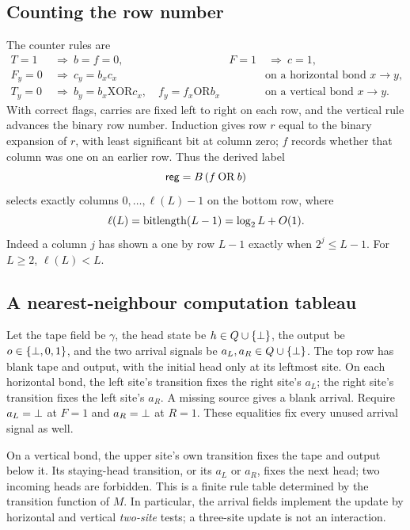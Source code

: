 \subsection{Counting the row number}
The counter rules are
\begin{align*}
 T=1&\ \Longrightarrow\ b=f=0,&
 F=1&\ \Longrightarrow\ c=1,\\
 F_y=0&\ \Longrightarrow\ c_y=b_xc_x
      &&\text{on a horizontal bond }x\to y,\\
 T_y=0&\ \Longrightarrow\ b_y=b_x\mathbin{\mathrm{XOR}}c_x,
 \quad f_y=f_x\mathbin{\mathrm{OR}}b_x
      &&\text{on a vertical bond }x\to y.
\end{align*}
With correct flags, carries are fixed left to right on each row, and the
vertical rule advances the binary row number. Induction gives row $r$
equal to the binary expansion of $r$, with least significant bit at column
zero; $f$ records whether that column was one on an earlier row. Thus the
derived label
\begin{equation}\label{eq:register}
 \mathsf{reg}=B\,(f\mathbin{\mathrm{OR}}b)
\end{equation}
selects exactly columns $0,\ldots,\ell(L)-1$ on the bottom row, where
\begin{equation}\label{eq:ell}
 \ell(L)=\operatorname{bitlength}(L-1)=\log_2 L+O(1).
\end{equation}
Indeed a column $j$ has shown a one by row $L-1$ exactly when
$2^j\leq L-1$. For $L\geq2$, $\ell(L)<L$.

\subsection{A nearest-neighbour computation tableau}
Let the tape field be $\gamma$, the head state be $h\in Q\cup\{\bot\}$,
the output be $o\in\{\bot,0,1\}$, and the two arrival signals be
$a_L,a_R\in Q\cup\{\bot\}$. The top row has blank tape and output,
with the initial head only at its leftmost site. On each horizontal bond,
the left site's transition fixes the right site's $a_L$; the right site's
transition fixes the left site's $a_R$. A missing source gives a blank
arrival. Require $a_L=\bot$ at $F=1$ and $a_R=\bot$ at $R=1$.
These equalities fix every unused arrival signal as well.

On a vertical bond, the upper site's own transition fixes the tape and
output below it. Its staying-head transition, or its $a_L$ or $a_R$,
fixes the next head; two incoming heads are forbidden. This is a finite
rule table determined by the transition function of $M$. In particular,
the arrival fields implement the update by horizontal and vertical
\emph{two-site} tests; a three-site update is not an interaction.

